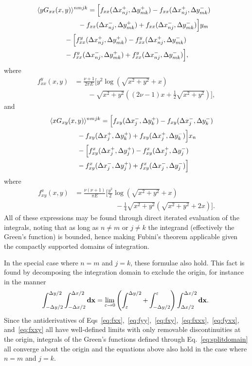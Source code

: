 \documentclass[aps,prl,reprint,twocolumn,groupedaddress,showpacs]{revtex4-1}
\def\d{{\bf d}}
\def\x{{\bf x}}
\begin{document}
\begin{align}
\lefteqn{\langle yG_{xx}(x,y) \rangle^{nmjk} = \Big[f_{xx}( \Delta x_{nj}^+,\Delta y_{mk}^+) - f_{xx}( \Delta x_{nj}^+,\Delta y_{mk}^-) } \nonumber\\
&\qquad\qquad\qquad-f_{xx}(\Delta x_{nj}^-, \Delta y_{mk}^+) + f_{xx}(\Delta x_{nj}^- , \Delta y_{mk}^-)  \Big] y_m\nonumber\\
&\qquad\qquad - \Big[ f^y_{xx}(\Delta x_{nj}^+,\Delta y_{mk}^+) - f^y_{xx}(\Delta x_{nj}^+,\Delta y_{mk}^-)\nonumber\\
&\qquad\qquad - f^y_{xx}(\Delta x_{nj}^-,\Delta y_{mk}^+) + f^y_{xx}(\Delta x_{nj}^-,\Delta y_{mk}^-)  \Big],
\end{align}
where
\begin{align}
f^y_{xx}(x,y) &=\frac{\nu+1}{2\pi E} \Bigg[y^2\log\left(\sqrt{x^2+y^2}+x \right)  \nonumber\\
&\qquad- \sqrt{x^2+y^2}\left((2\nu-1)x + \frac{1}{2}\sqrt{x^2+y^2} \right)  \Bigg], \label{eq:fyxx}
\end{align}
and
\begin{align}
\lefteqn{\langle xG_{xy}(x,y) \rangle^{nmjk} = \Big[ f_{xy}(\Delta x_j^-, \Delta y_k^+) - f_{xy}(\Delta x_j^-,\Delta y_k^-) } \nonumber\\
&\qquad\qquad- f_{xy}(\Delta x_j^+,\Delta y_k^+) + f_{xy} (\Delta x_j^+,\Delta y_k^-) \Big]x_n\nonumber\\
&\qquad\qquad -   \Big[ f_{xy}^x(\Delta x_j^+,\Delta y_j^+) - f_{xy}^x(\Delta x_j^+,\Delta y_j^-) \nonumber\\
&\qquad\qquad- f_{xy}^x(\Delta x_j^-,\Delta y_j^+) + f_{xy}^x(\Delta x_j^-,\Delta y_j^-)\Big]
\end{align}
where
\begin{align}
f_{xy}^x(x,y) &=\frac{\nu(\nu+1)}{\pi E}\Big[ \frac{y^2}{2}\log\left(\sqrt{x^2+y^2} +x \right) \nonumber\\
&\qquad\qquad\qquad-\frac{1}{4}\sqrt{x^2+y^2}\left(\sqrt{x^2+y^2}+2x\right) \Big]. \label{eq:fxxy}
\end{align}
All of these expressions may be found through direct iterated evaluation of the integrals, noting that
as long as $n\neq m$ or $j\neq k$ the integrand (effectively the Green's function) is bounded, hence making
Fubini's theorem applicable given the compactly supported domains of integration.

In the 
special case where $n=m$ and $j=k$, these formulae also hold. This fact is found by decomposing the integration domain to
exclude the origin, for instance in the manner
\begin{equation}
\int_{ -\Delta y/2 }^{\Delta y/2 }\int_{- \Delta x/2 }^{\Delta x/2 } \d\x = \lim_{\varepsilon\to0} \left( \int_\varepsilon^{\Delta y/2}  +  \int_{-\Delta y/2}^\varepsilon   \right)\int_{\Delta x/2}^{\Delta x/2} \d\x.~\label{eq:splitdomain}
\end{equation}
Since the antiderivatives of Eqs~\ref{eq:fxx},~\ref{eq:fyy},~\ref{eq:fxy},~\ref{eq:fxxx},~\ref{eq:fyxx}, and~\ref{eq:fxxy} all have well-defined limits with only removable discontinuities at the origin,  integrals of the Green's functions defined through Eq.~\ref{eq:splitdomain} all converge about the origin and the equations above also hold in the case where $n=m$ and $j=k$.
\end{document}
